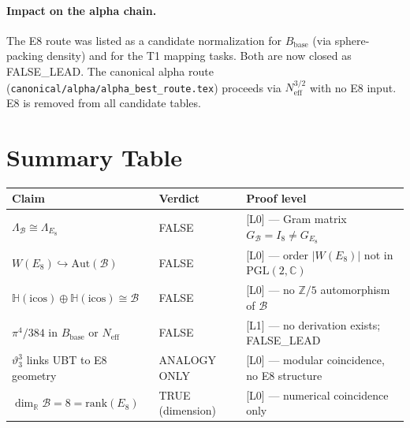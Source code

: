\documentclass[12pt,a4paper]{article}
\theoremstyle{definition}
\theoremstyle{remark}
\begin{document}
\paragraph{Impact on the alpha chain.}
The E8 route was listed as a candidate normalization for $B_{\mathrm{base}}$
(via sphere-packing density) and for the T1 mapping tasks.
Both are now closed as FALSE\_LEAD.
The canonical alpha route (\texttt{canonical/alpha/alpha\_best\_route.tex})
proceeds via $N_{\mathrm{eff}}^{3/2}$ with no E8 input.  E8 is removed from
all candidate tables.

\section{Summary Table}
\label{sec:e8:summary}

\begin{center}
\renewcommand{\arraystretch}{1.3}
\begin{tabular}{lll}
\toprule
Claim & Verdict & Proof level \\
\midrule
$\Lambda_{\mathcal{B}} \cong \Lambda_{E_8}$ & FALSE & [L0] — Gram matrix $G_{\mathcal{B}}=I_8 \neq G_{E_8}$ \\
$W(E_8) \hookrightarrow \mathrm{Aut}(\mathcal{B})$ & FALSE & [L0] — order $|W(E_8)|$ not in $\mathrm{PGL}(2,\mathbb{C})$ \\
$\mathbb{H}(\mathrm{icos})\oplus\mathbb{H}(\mathrm{icos}) \cong \mathcal{B}$ & FALSE & [L0] — no $\mathbb{Z}/5$ automorphism of $\mathcal{B}$ \\
$\pi^4/384$ in $B_{\mathrm{base}}$ or $N_{\mathrm{eff}}$ & FALSE & [L1] — no derivation exists; FALSE\_LEAD \\
$\vartheta_3^3$ links UBT to E8 geometry & ANALOGY ONLY & [L0] — modular coincidence, no E8 structure \\
\midrule
$\dim_\mathbb{R}\mathcal{B} = 8 = \mathrm{rank}(E_8)$ & TRUE (dimension) & [L0] — numerical coincidence only \\
\bottomrule
\end{tabular}
\end{center}

\ifdefined\INCLUDEMODE
\else
  
\end{document}
